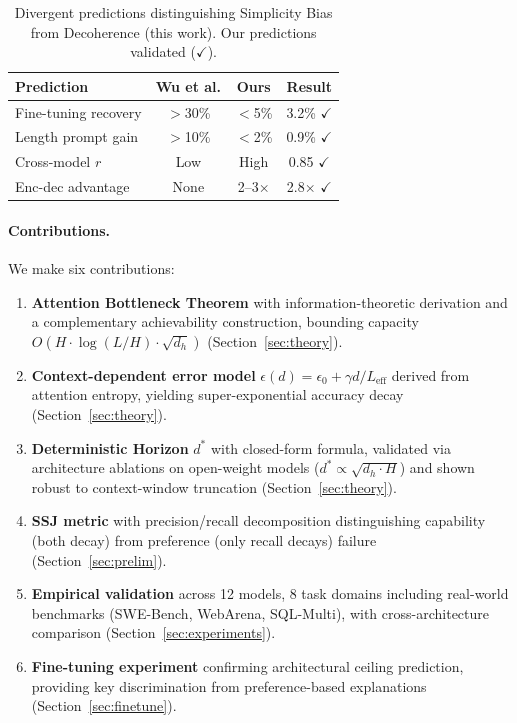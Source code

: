 \documentclass{article}
\theoremstyle{plain}
\theoremstyle{definition}
\theoremstyle{remark}
\newcommand{\Leff}{L_{\mathrm{eff}}}
\begin{document}
\begin{table}[t]
\caption{Divergent predictions distinguishing Simplicity Bias \citep{wu2025more} from Decoherence (this work). Our predictions validated ($\checkmark$).}
\label{tab:predictions}
\vskip 0.1in
\centering
\footnotesize
\begin{tabular}{@{}p{2.2cm}ccc@{}}
\toprule
\textbf{Prediction} & \textbf{Wu et al.} & \textbf{Ours} & \textbf{Result} \\
\midrule
Fine-tuning recovery & $>$30\% & $<$5\% & 3.2\% $\checkmark$ \\
Length prompt gain & $>$10\% & $<$2\% & 0.9\% $\checkmark$ \\
Cross-model $r$ & Low & High & 0.85 $\checkmark$ \\
Enc-dec advantage & None & 2--3$\times$ & 2.8$\times$ $\checkmark$ \\
\bottomrule
\end{tabular}
\vskip -0.1in
\end{table}

\paragraph{Contributions.} We make six contributions:
\begin{enumerate}[leftmargin=*,itemsep=1pt]
\item \textbf{Attention Bottleneck Theorem} with information-theoretic derivation and a complementary achievability construction, bounding capacity $O(H \cdot \log(L/H) \cdot \sqrt{d_h})$ (Section~\ref{sec:theory}).
\item \textbf{Context-dependent error model} $\epsilon(d) = \epsilon_0 + \gamma d/\Leff$ derived from attention entropy, yielding super-exponential accuracy decay (Section~\ref{sec:theory}).
\item \textbf{Deterministic Horizon} $d^*$ with closed-form formula, validated via architecture ablations on open-weight models ($d^* \propto \sqrt{d_h \cdot H}$) and shown robust to context-window truncation (Section~\ref{sec:theory}).
\item \textbf{SSJ metric} with precision/recall decomposition distinguishing capability (both decay) from preference (only recall decays) failure (Section~\ref{sec:prelim}).
\item \textbf{Empirical validation} across 12 models, 8 task domains including real-world benchmarks (SWE-Bench, WebArena, SQL-Multi), with cross-architecture comparison (Section~\ref{sec:experiments}).
\item \textbf{Fine-tuning experiment} confirming architectural ceiling prediction, providing key discrimination from preference-based explanations (Section~\ref{sec:finetune}).
\end{enumerate}
\end{document}
